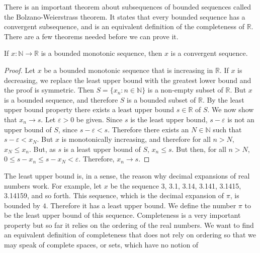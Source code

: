     There is an important theorem about
    subsequences of bounded sequences called the
    Bolzano-Weierstrass theorem. It states that
    every bounded sequence has a convergent subsequence,
    and is an equivalent definition of the
    completeness of $\mathbb{R}$. There are a few theorems
    needed before we can prove it.
    \begin{theorem}
        \label{th:funct:bounded_monotone_%
               sequences_converge}
        If $x:\mathbb{N}\rightarrow\mathbb{R}$
        is a bounded monotonic sequence,
        then $x$ is a convergent sequence.
    \end{theorem}
    \begin{proof}
        Let $x$ be a bounded monotonic sequence that
        is increasing in $\mathbb{R}$.
        If $x$ is decreasing, we replace the least
        upper bound with the greatest lower
        bound and the proof is symmetric.
        Then $S=\{x_{n}:n\in\mathbb{N}\}$ is a
        non-empty subset of $\mathbb{R}$. But $x$ is
        a bounded sequence, and therefore $S$ is a
        bounded subset of $\mathbb{R}$. By the least
        upper bound property there exists a least
        upper bound $s\in\mathbb{R}$ of $S$.
        We now show that $x_{n}\rightarrow{s}$.
        Let $\varepsilon>0$ be given. Since $s$ is
        the least upper bound, $s-\varepsilon$
        is not an upper bound of $S$, since
        $s-\varepsilon<s$. Therefore there exists
        an $N\in\mathbb{N}$ such that
        $s-\varepsilon<x_{N}$. But $x$ is
        monotonically increasing, and therefore
        for all $n>N$, $x_{N}\leq{x_{n}}$.
        But, as $s$ is a least upper
        bound of $S$, $x_{n}\leq{s}$. But then,
        for all $n>N$,
        $0\leq{s-x_{n}}\leq{s-x_{N}}<\varepsilon$.
        Therefore, $x_{n}\rightarrow{s}$.
    \end{proof}
    The least upper bound is, in a sense, the
    reason why decimal expansions of
    real numbers work. For example, let $x$ be the
    sequence 3, 3.1, 3.14, 3.141, 3.1415, 3.14159,
    and so forth. This sequence, which is
    the decimal expansion of $\pi$, is bounded by $4$.
    Therefore it has a least upper bound.
    We define the number $\pi$
    to be the least upper bound of this sequence.
    Completeness is a very important property
    but so far it relies on the ordering
    of the real numbers.
    We want to find an equivalent definition
    of completeness that does not rely on ordering
    so that we may speak of complete spaces,
    or sets, which have no notion of
